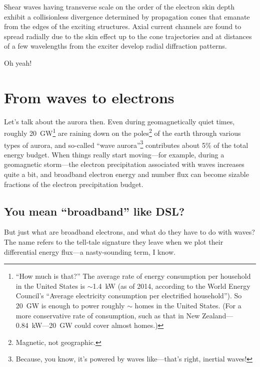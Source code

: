 \begin{displayquote}
  Shear \Alf waves having transverse scale on the order of the electron skin
  depth exhibit a collisionless divergence determined by propagation cones that
  emanate from the edges of the exciting structures. Axial current channels are
  found to spread radially due to the skin effect up to the cone trajectories
  and at distances of a few wavelengths from the exciter develop radial
  diffraction patterns.
\end{displayquote}

Oh yeah!

\section{From waves to electrons}

Let's talk about the aurora then. Even during geomagnetically quiet times,
roughly 20~GW\footnote{``How much is that?'' The average rate of energy
  consumption per household in the United States is $\sim$1.4~kW (as of 2014,
  according to the World Energy Council's ``Average electricity consumption per
  electrified household''). So 20~GW is enough to power roughly
  $\sim$ homes in the United States. (For a more conservative
  rate of consumption, such as that in New Zealand---0.84~kW---20~GW could cover
  almost  homes.)} \citep{Newell2009} are raining down on the
poles\footnote{Magnetic, not geographic.} of the earth through various types of
aurora, and so-called ``wave aurora''\footnote{Because, you know, it's powered
  by waves like---that's right, inertial \Alf waves!} contributes about 5\% of
the total energy budget. When things really start moving---for example, during a
geomagnetic storm---the electron precipitation associated with \Alf waves
increases quite a bit, and broadband electron energy and number flux can become
sizable fractions of the electron precipitation budget.

\subsection{You mean ``broadband'' like DSL?}

But just what are broadband electrons, and what do they have to do
with \Alf waves? The name refers to the tell-tale signature they leave
when we plot their differential energy flux---a nasty-sounding term, I
know.

